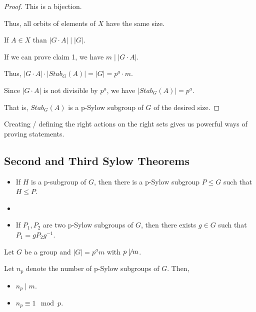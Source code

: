\begin{proof}
    This is a bijection. 

    Thus, all orbits of elements of $X$ have the same size. 

    \begin{claim}[Claim 1]
        If $A \in X$ than $|G \cdot A| \mid |G|$.
    \end{claim}

    If we can prove claim 1, we have $m \mid | G \cdot A|$.

    Thus, $|G \cdot A| \cdot | Stab_G(A) | = |G| = p^a \cdot m$.

    Since $|G \cdot A|$ is not divisible by $p^a$, we have $| Stab_G(A) | = p^a$.

    That is, $ Stab_G(A)$ is a p-Sylow subgroup of $G$ of the desired size.
\end{proof}

\begin{remark}
    Creating / defining the right actions on the right sets gives us powerful ways of proving statements. 
\end{remark}

\subsection{Second and Third Sylow Theorems}

\begin{theorem}\label{thm:second-sylow}
    \begin{itemize}
        \item If $H$ is a p-subgroup of $G$, then there is a p-Sylow subgroup $P \leq G$ such that $H \leq P$.
        \item \item If $P_1, P_2$ are two p-Sylow subgroups of $G$, then there exists $g \in G$ such that $P_1 = gP_2g^{-1}$.
    \end{itemize}
\end{theorem}

\begin{theorem}\label{thm:third-sylow}
    Let $G$ be a group and $|G| = p^a m$ with $p \not\mid m$. 

    Let $n_p$ denote the number of p-Sylow subgroups of $G$. Then, \begin{itemize}
        \item $n_p \mid m$.
        \item $n_p \equiv 1 \mod p$.
    \end{itemize}
\end{theorem}

